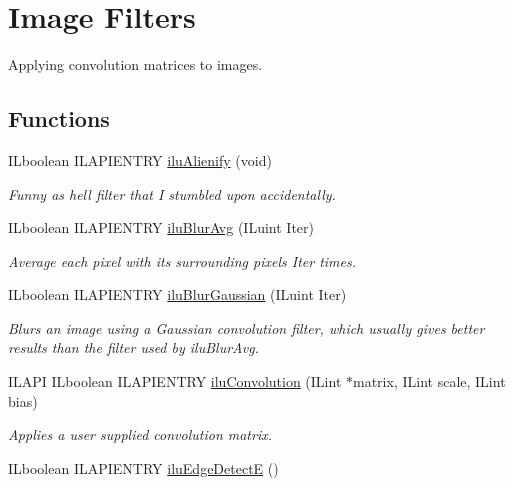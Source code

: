 \hypertarget{group__ilu__filter}{\section{Image Filters}
\label{group__ilu__filter}
}


Applying convolution matrices to images.  


\subsection*{Functions}
\begin{DoxyCompactItemize}
\item 
I\+Lboolean I\+L\+A\+P\+I\+E\+N\+T\+R\+Y \hyperlink{group__ilu__filter_gacb6e1a0e8dc10748f1cfbf60b1f8c350}{ilu\+Alienify} (void)
\begin{DoxyCompactList}\small\item\em Funny as hell filter that I stumbled upon accidentally. \end{DoxyCompactList}\item 
I\+Lboolean I\+L\+A\+P\+I\+E\+N\+T\+R\+Y \hyperlink{group__ilu__filter_ga017478330f243e5bb6e6edc29cdf1f37}{ilu\+Blur\+Avg} (I\+Luint Iter)
\begin{DoxyCompactList}\small\item\em Average each pixel with its surrounding pixels {\itshape Iter} times. \end{DoxyCompactList}\item 
I\+Lboolean I\+L\+A\+P\+I\+E\+N\+T\+R\+Y \hyperlink{group__ilu__filter_ga4163c484488b3afc352e3ed6c768babf}{ilu\+Blur\+Gaussian} (I\+Luint Iter)
\begin{DoxyCompactList}\small\item\em Blurs an image using a Gaussian convolution filter, which usually gives better results than the filter used by ilu\+Blur\+Avg. \end{DoxyCompactList}\item 
I\+L\+A\+P\+I I\+Lboolean I\+L\+A\+P\+I\+E\+N\+T\+R\+Y \hyperlink{group__ilu__filter_gaeb5bb85ceb172bd9742f7f0730a1d440}{ilu\+Convolution} (I\+Lint $\ast$matrix, I\+Lint scale, I\+Lint bias)
\begin{DoxyCompactList}\small\item\em Applies a user supplied convolution matrix. \end{DoxyCompactList}\item 
I\+Lboolean I\+L\+A\+P\+I\+E\+N\+T\+R\+Y \hyperlink{group__ilu__filter_gafbd320c463d5e8a45e68d0edb3973597}{ilu\+Edge\+Detect\+E} ()

\end{DoxyCompactItemize}
